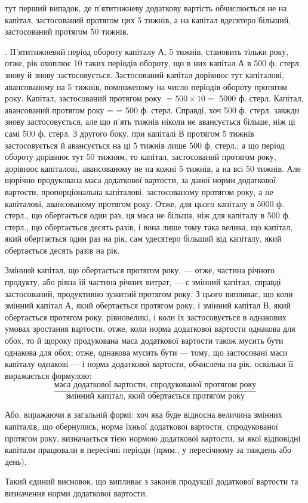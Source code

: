 \parcont{}  %
тут перший випадок, де п’ятитижневу додаткову вартість обчислюється
не на капітал, застосований протягом цих 5 тижнів, а на капітал вдесятеро
більший, застосований протягом 50 тижнів.

. П’ятитижневий період обороту капіталу $А$, 5 тижнів,
становить тільки  року, отже, рік охоплює 10 таких періодів обороту,
що в них капітал $А$ в 500 ф. стерл. знову й знову застосовується.
Застосований капітал дорівнює тут капіталові, авансованому на 5 тижнів,
помноженому на число періодів обороту протягом року. Капітал, застосований
протягом року $= 500 × 10 =$ 5000 ф. стерл. Капітал, авансований
протягом року =  = 500 ф. стерл. Справді, хоч 500 ф. стерл. завжди
знову застосовується, але що п’ять тижнів ніколи не авансується більше,
ніж ці самі 500 ф. стерл. З другого боку, при капіталі $В$ протягом 5 тижнів
застосовується й авансується на ці 5 тижнів лише 500 ф. стерл.; а що
період обороту дорівнює тут 50 тижням, то капітал, застосований протягом
року, дорівнює капіталові, авансованому не на кожні 5 тижнів, а на
всі 50 тижнів. Але щорічно продукована маса додаткової вартости, за
даної норми додаткової вартости, пропорціональна капіталові, застосованому
протягом року, а не капіталові, авансованому протягом року. Отже, для
цього капіталу в 5000 ф. стерл., що обертається один раз, ця маса не
більша, ніж для капіталу в 500 ф. стерл., що обертається десять разів, і
вона лише тому така велика, що капітал, який обертається один раз на
рік, сам удесятеро більший від капіталу, який обертається десять разів
на рік.

Змінний капітал, що обертається протягом року, — отже, частина річного
продукту, або рівна їй частина річних витрат, — є змінний капітал,
справді застосований, продуктивно зужитий протягом року. З цього випливає,
що коли змінний капітал $А$, який обертається протягом року, і
змінний капітал $В$, який обертається протягом року, рівновеликі, і коли
їх застосовується в однакових умовах зростання вартости, отже, коли норма
додаткової вартости однакова для обох, то й щороку продукована
маса додаткової вартости також мусить бути однакова для обох; отже,
однакова мусить бути — тому, що застосовані маси капіталу однакові — і
норма додаткової вартости, обчислена на рік, оскільки її виражається
формулою:\[
\frac{\text{маса додаткової вартости, спродукованої протягом року}}{\text{змінний капітал, який обертається протягом
року}}
\]

Або, виражаючи в загальній формі: хоч яка буде відносна величина
змінних капіталів, що обернулись, норма їхньої додаткової вартости,
спродукованої протягом року, визначається тією нормою додаткової вартости,
за якої відповідні капітали працювали в пересічні періоди (прим.,
у пересічному за тиждень або день).

Такий єдиний висновок, що випливає з законів продукції додаткової
вартости та визначення норми додаткової вартости.
